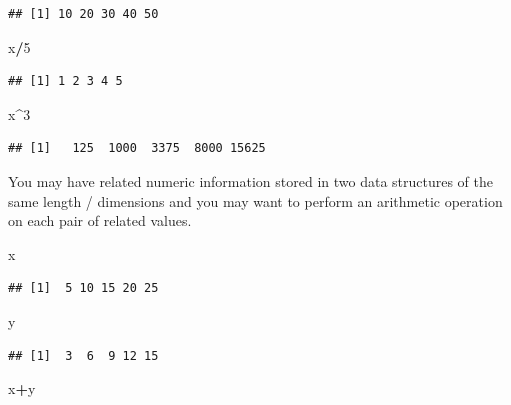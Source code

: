 \documentclass[
]{book}
\newenvironment{Shaded}{\begin{snugshade}}{\end{snugshade}}
\newcommand{\DecValTok}[1]{\textcolor[rgb]{0.00,0.00,0.81}{#1}}
\newcommand{\NormalTok}[1]{#1}
\newcommand{\SpecialCharTok}[1]{\textcolor[rgb]{0.81,0.36,0.00}{\textbf{#1}}}
\theoremstyle{definition}
\theoremstyle{definition}
\theoremstyle{definition}
\theoremstyle{definition}
\theoremstyle{remark}
\begin{document}
\begin{verbatim}
## [1] 10 20 30 40 50
\end{verbatim}

\begin{Shaded}
\begin{Highlighting}[]
\NormalTok{x}\SpecialCharTok{/}\DecValTok{5}
\end{Highlighting}
\end{Shaded}

\begin{verbatim}
## [1] 1 2 3 4 5
\end{verbatim}

\begin{Shaded}
\begin{Highlighting}[]
\NormalTok{x}\SpecialCharTok{\^{}}\DecValTok{3}
\end{Highlighting}
\end{Shaded}

\begin{verbatim}
## [1]   125  1000  3375  8000 15625
\end{verbatim}

You may have related numeric information stored in two data structures of the same length / dimensions and you may want to perform an arithmetic operation on each pair of related values.

\begin{Shaded}
\begin{Highlighting}[]
\NormalTok{x}
\end{Highlighting}
\end{Shaded}

\begin{verbatim}
## [1]  5 10 15 20 25
\end{verbatim}

\begin{Shaded}
\begin{Highlighting}[]
\NormalTok{y}
\end{Highlighting}
\end{Shaded}

\begin{verbatim}
## [1]  3  6  9 12 15
\end{verbatim}

\begin{Shaded}
\begin{Highlighting}[]
\NormalTok{x}\SpecialCharTok{+}\NormalTok{y}
\end{Highlighting}
\end{Shaded}
\end{document}
